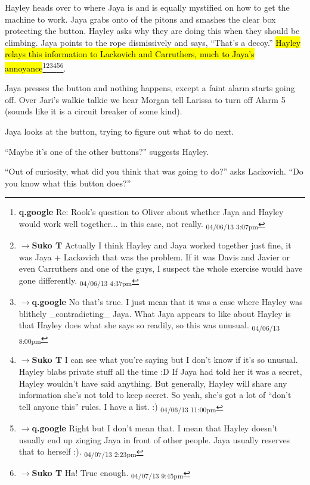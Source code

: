 Hayley heads over to where Jaya is and is equally mystified on how to get the machine to work.  Jaya grabs onto of the pitons and smashes the clear box protecting the button.  Hayley asks why they are doing this when they should be climbing.  Jaya points to the rope dismissively and says, ``That's a decoy.''   \hl{Hayley relays this information to Lackovich and Carruthers, much to Jaya's annoyance}\footnote{\textbf{q.google }Re: Rook's question to Oliver about whether Jaya and Hayley would work well together... in this case, not really. \textsubscript{04/06/13 3:07pm}}\footnote{$\rightarrow$\textbf{Suko T }Actually I think Hayley and Jaya worked together just fine, it was Jaya + Lackovich that was the problem.  If it was Davis and Javier or even Carruthers and one of the guys, I suspect the whole exercise would have gone differently. \textsubscript{04/06/13 4:37pm}}\footnote{$\rightarrow$\textbf{q.google }No that's true.  I just mean that it was a case where Hayley was blithely \_contradicting\_ Jaya.  What Jaya appears to like about Hayley is that Hayley does what she says so readily, so this was unusual. \textsubscript{04/06/13 8:00pm}}\footnote{$\rightarrow$\textbf{Suko T }I can see what you're saying but I don't know if it's so unusual.  Hayley blabs private stuff all the time :D  If Jaya had told her it was a secret, Hayley wouldn't have said anything.  But generally, Hayley will share any information she's not told to keep secret.  So yeah, she's got a lot of ``don't tell anyone this'' rules.   I have a list. :) \textsubscript{04/06/13 11:00pm}}\footnote{$\rightarrow$\textbf{q.google }Right but I don't mean that.  I mean that Hayley doesn't usually end up zinging Jaya in front of other people.  Jaya usually reserves that to herself :). \textsubscript{04/07/13 2:23pm}}\footnote{$\rightarrow$\textbf{Suko T }Ha!  True enough. \textsubscript{04/07/13 9:45pm}}.



Jaya presses the button and nothing happens, except a faint alarm starts going off.  Over Jari's walkie talkie we hear Morgan tell Larissa to turn off Alarm 5 (sounds like it is a circuit breaker of some kind).



Jaya looks at the button, trying to figure out what to do next.

``Maybe it's one of the other buttons?'' suggests Hayley.

``Out of curiosity, what did you think that was going to do?'' asks Lackovich.  ``Do you know what this button does?''


